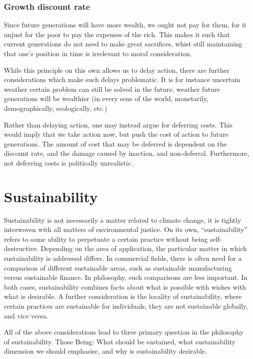 \documentclass[12pt]{report}
\begin{document}
\subsection{Growth discount rate}
Since future generations will have more wealth, we ought not pay for them, for
it unjust for the poor to pay the expenses of the rich. This makes it such that
current generations do not need to make great sacrifices, whist still
maintaining that one's position in time is irrelevant to moral consideration.

While this principle on this own allows us to delay action, there are further
considerations which make such delays problematic. It is for instance uncertain
weather certain problem can still be solved in the future, weather future
generations will be wealthier (in every sens of the world, monetarily,
demographically, ecologically, etc.)

Rather than delaying action, one may instead argue for deferring costs. This
would imply that we take action now, but push the cost of action to future
generations. The amount of cost that may be deferred is dependent on the
discount rate, and the damage caused by inaction, and non-deferral. Furthermore,
not deferring costs is politically unrealistic.

\chapter{Sustainability}

Sustainability is not necessarily a matter related to climate change, it is
tightly interwoven with all matters of environmental justice. On its own,
``sustainability'' refers to some ability to perpetuate a certain practice
without being self-destructive. Depending on the area of application, the
particular matter in which sustainability is addressed differs. In commercial
fields, there is often need for a comparison of different sustainable areas,
such as sustainable manufacturing versus sustainable finance. In philosophy,
such comparisons are less important. In both cases, sustainability combines
facts about what is possible with wishes with what is desirable. A further
consideration is the locality of sustainability, where certain practices are
sustainable for individuals, they are not sustainable globally, and vice versa.

All of the above considerations lead to three primary question in the philosophy
of sustainability. Those Being: What should be sustained, what sustainability
dimension we should emphasise, and why is sustainability desirable.
\end{document}

